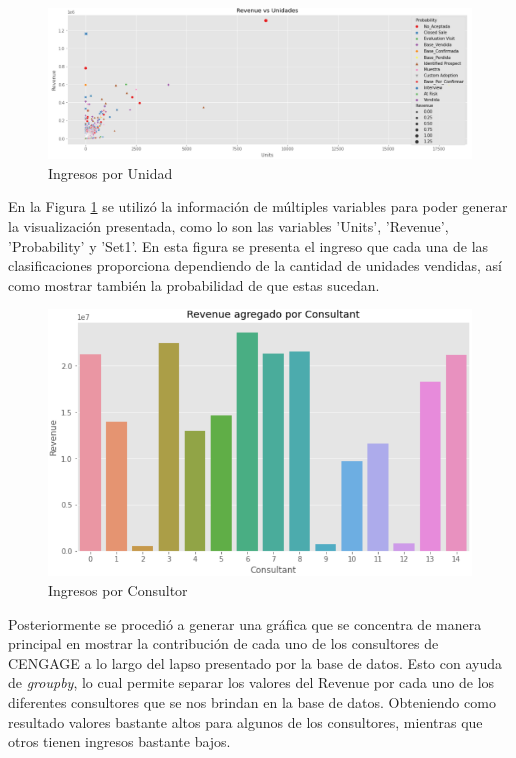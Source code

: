 \documentclass{article}
\begin{document}
        \newpage

        \begin{figure}[h!]
            \centering
            \includegraphics[width = \columnwidth]{img/revenue_unit.png}
            \caption{Ingresos por Unidad}
            \label{fig:revUnit}
        \end{figure}

        En la Figura \ref{fig:revUnit} se utilizó la información de múltiples variables para poder generar la visualización presentada, como lo son las variables 'Units', 'Revenue', 'Probability' y 'Set1'. En esta figura se presenta el ingreso que cada una de las clasificaciones proporciona dependiendo de la cantidad de unidades vendidas, así como mostrar también la probabilidad de que estas sucedan.

        \vspace{3mm}

        \begin{figure}[h!]
            \centering
            \includegraphics[width = \columnwidth]{img/revenue_consultant.png}
            \caption{Ingresos por Consultor}
            \label{fig:revConsultor}
        \end{figure}

        Posteriormente se procedió a generar una gráfica que se concentra de manera principal en mostrar la contribución de cada uno de los consultores de CENGAGE a lo largo del lapso presentado por la base de datos. Esto con ayuda de \emph{groupby}, lo cual permite separar los valores del Revenue por cada uno de los diferentes consultores que se nos brindan en la base de datos. Obteniendo como resultado valores bastante altos para algunos de los consultores, mientras que otros tienen ingresos bastante bajos.
\end{document}
